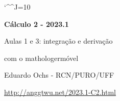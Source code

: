 \documentclass[oneside,12pt]{article}
\begin{document}
\def\u#1{\par{\footnotesize \url{#1}}}
\def\drafturl{http://anggtwu.net/LATEX/2023-1-C2.pdf}
\def\drafturl{http://anggtwu.net/2023.1-C2.html}
\def\draftfooter{\tiny \href{\drafturl}{\jobname{}} \ColorBrown{\shorttoday{} \hours}}


\catcode`\^^J=10

\def\Caurl   #1{\expr{Caurl("#1")}}
\def\Cahref#1#2{\href{\Caurl{#1}}{#2}}
\def\Ca      #1{\Cahref{#1}{#1}}

\def\pictgridstyle{\color{GrayPale}\linethickness{0.3pt}}
\def\pictaxesstyle{\linethickness{0.5pt}}
\def\pictnaxesstyle{\color{GrayPale}\linethickness{0.5pt}}
\celllower=2.5pt

\pu




%

\thispagestyle{empty}

\begin{center}

\vspace*{1.2cm}

{\bf \Large Cálculo 2 - 2023.1}

\bsk

Aulas 1 e 3: integração e derivação

com o mathologermóvel

\bsk

Eduardo Ochs - RCN/PURO/UFF

\url{http://anggtwu.net/2023.1-C2.html}

\end{center}

\newpage

\end{document}
